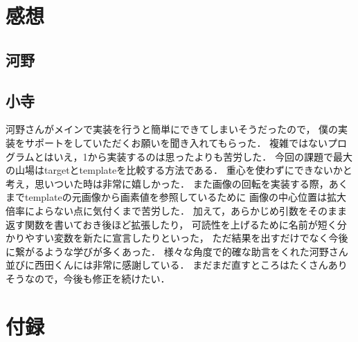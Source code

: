 \documentclass[uplatex,dvipdfmx]{jsarticle}
\begin{document}
\section{感想}
\subsection{河野}



\subsection{小寺}
河野さんがメインで実装を行うと簡単にできてしまいそうだったので，
僕の実装をサポートをしていただくお願いを聞き入れてもらった．
複雑ではないプログラムとはいえ，1から実装するのは思ったよりも苦労した．
今回の課題で最大の山場はtargetとtemplateを比較する方法である．
重心を使わずにできないかと考え，思いついた時は非常に嬉しかった．
また画像の回転を実装する際，あくまでtemplateの元画像から画素値を参照しているために
画像の中心位置は拡大倍率によらない点に気付くまで苦労した．
加えて，あらかじめ引数をそのまま返す関数を書いておき後ほど拡張したり，
可読性を上げるために名前が短く分かりやすい変数を新たに宣言したりといった，
ただ結果を出すだけでなく今後に繋がるような学びが多くあった．
様々な角度で的確な助言をくれた河野さん並びに西田くんには非常に感謝している．
まだまだ直すところはたくさんありそうなので，今後も修正を続けたい．


\section*{付録}

\end{document}

